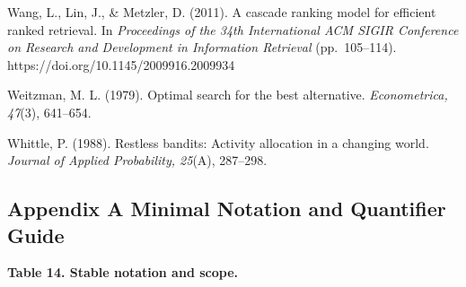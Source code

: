 \documentclass[
  11pt]{article}
\begin{document}
Wang, L., Lin, J., \& Metzler, D. (2011). A cascade ranking model for
efficient ranked retrieval. In \emph{Proceedings of the 34th
International ACM SIGIR Conference on Research and Development in
Information Retrieval} (pp.~105--114).
https://doi.org/10.1145/2009916.2009934

Weitzman, M. L. (1979). Optimal search for the best alternative.
\emph{Econometrica, 47}(3), 641--654.

Whittle, P. (1988). Restless bandits: Activity allocation in a changing
world. \emph{Journal of Applied Probability, 25}(A), 287--298.

\subsection{Appendix A Minimal Notation and Quantifier
Guide}\label{appendix-a-minimal-notation-and-quantifier-guide}

\textbf{Table 14. Stable notation and scope.}
\end{document}
